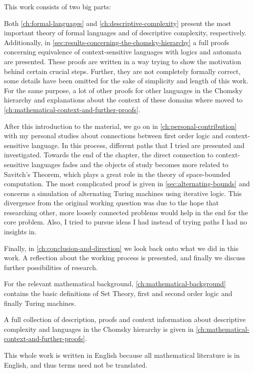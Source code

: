 This work consists of two big parts:

Both \cref{ch:formal-languages} and \cref{ch:descriptive-complexity} present the most important theory of formal languages and of descriptive complexity, respectively.
Additionally, in \cref{sec:results-concerning-the-chomsky-hierarchy} a full proofs concerning equivalence of context-sensitive languages with logics and automata are presented.
These proofs are written in a way trying to show the motivation behind certain crucial steps.
Further, they are not completely formally correct, some details have been omitted for the sake of simplicity and length of this work.
For the same purpose, a lot of other proofs for other languages in the Chomsky hierarchy and explanations about the context of these domains where moved to \cref{ch:mathematical-context-and-further-proofs}.

After this introduction to the material, we go on in \cref{ch:personal-contribution} with my personal studies about connections between first order logic and context-sensitive language.
In this process, different paths that I tried are presented and investigated.
Towards the end of the chapter, the direct connection to context-sensitive languages fades and the objects of study becomes more related to Savitch's Theorem, which plays a great role in the theory of space-bounded computation.
The most complicated proof is given in \cref{sec:alternating-bounds} and concerns a simulation of alternating Turing machines using iterative logic.
This divergence from the original working question was due to the hope that researching other, more loosely connected problems would help in the end for the core problem.
Also, I tried to pursue ideas I had instead of trying paths I had no insights in.

Finally, in \cref{ch:conclusion-and-direction} we look back onto what we did in this work.
A reflection about the working process is presented, and finally we discuss further possibilities of research.

For the relevant mathematical background, \cref{ch:mathematical-background} contains the basic definitions of Set Theory, first and second order logic and finally Turing machines.

A full collection of description, proofs and context information about descriptive complexity and languages in the Chomsky hierarchy is given in \cref{ch:mathematical-context-and-further-proofs}.

This whole work is written in English because all mathematical literature is in English, and thus terms need not be translated.